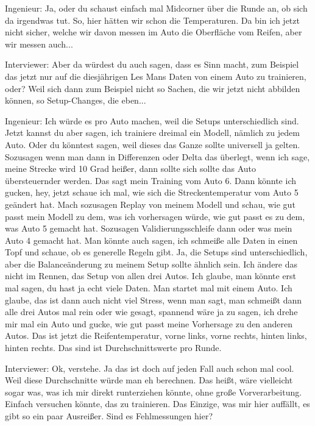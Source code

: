 Ingenieur:
Ja, oder du schaust einfach mal Midcorner über die Runde an, ob sich da irgendwas tut. So, hier hätten wir schon die Temperaturen. Da bin ich jetzt nicht sicher, welche wir davon messen im Auto die Oberfläche vom Reifen, aber wir messen auch... 

Interviewer:
Aber da würdest du auch sagen, dass  es Sinn macht, zum Beispiel das jetzt nur auf die diesjährigen Les Mans Daten von einem Auto zu trainieren, oder?  Weil sich dann zum Beispiel nicht so Sachen, die wir jetzt nicht abbilden können, so Setup-Changes, die eben... 

Ingenieur:
Ich würde es pro Auto machen, weil die Setups unterschiedlich sind. Jetzt kannst du aber sagen, ich trainiere dreimal ein Modell, nämlich zu jedem Auto. Oder du könntest sagen, weil dieses das Ganze sollte universell ja gelten. Sozusagen wenn man dann in Differenzen oder Delta das überlegt, wenn ich sage, meine Strecke wird 10 Grad heißer, dann sollte sich sollte das Auto  übersteuernder werden. Das sagt mein Training vom Auto 6. Dann könnte ich gucken, hey, jetzt schaue ich mal, wie sich die Streckentemperatur vom Auto 5 geändert hat. Mach sozusagen Replay von meinem Modell und schau, wie gut passt mein Modell zu dem, was ich vorhersagen würde, wie gut passt es zu dem, was Auto 5 gemacht hat. Sozusagen Validierungsschleife dann oder was mein Auto 4 gemacht hat. Man könnte auch sagen, ich schmeiße alle Daten in einen Topf und schaue, ob es generelle Regeln gibt. Ja,  die Setups sind unterschiedlich, aber die Balanceänderung zu meinem Setup sollte ähnlich sein.  Ich ändere das nicht im Rennen, das Setup von allen drei Autos.  Ich glaube, man könnte erst mal sagen, du hast ja echt viele Daten. Man startet mal mit einem Auto. Ich glaube, das ist dann auch nicht viel Stress, wenn man sagt, man schmeißt dann alle drei Autos mal rein oder wie gesagt, spannend wäre ja zu sagen, ich drehe mir mal ein Auto und gucke, wie gut passt meine Vorhersage zu den anderen Autos.  Das ist jetzt die Reifentemperatur, vorne links, vorne rechts, hinten links, hinten rechts. Das sind ist Durchschnittswerte pro Runde.

Interviewer: 
Ok, verstehe. Ja das ist doch auf jeden Fall auch schon mal cool. Weil diese Durchschnitte würde man eh berechnen. Das heißt, wäre vielleicht sogar was, was ich mir direkt runterziehen könnte, ohne große Vorverarbeitung. Einfach versuchen könnte, das zu trainieren. Das Einzige, was mir hier auffällt, es gibt so ein paar Ausreißer. Sind es  Fehlmessungen hier? 

